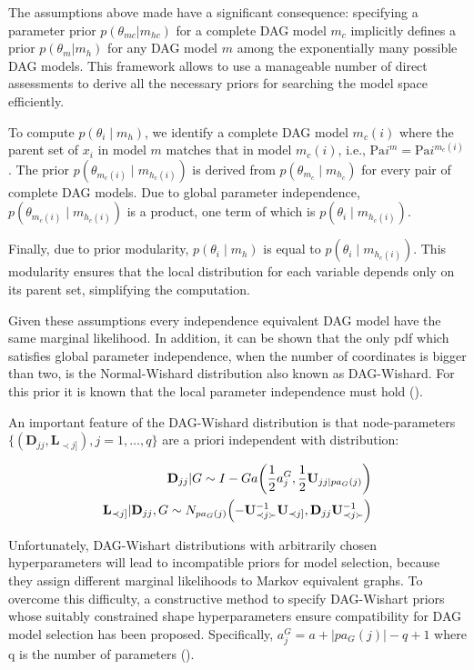 \documentclass{report}
\begin{document}
The assumptions above made have a significant consequence: specifying a parameter prior $p(\theta_{mc}|m_{hc})$ for a complete DAG model $m_c$ implicitly defines a prior $p(\theta_m | m_h)$ for any DAG model $m$ among the exponentially many possible DAG models. This framework allows  to use a manageable number of direct assessments to derive all the necessary priors for searching the model space efficiently. 

To compute $p(\theta_i \mid m_h)$, we identify a complete DAG model $m_c(i)$ where the parent set of $x_i$ in model $m$ matches that in model $m_c(i)$, i.e., $\text{Pa}i^m = \text{Pa}i^{m_c(i)}$. The prior $p(\theta_{m_c(i)} \mid m_{h_c(i)})$ is derived from $p(\theta_{m_c} \mid m_{h_c})$ for every pair of complete DAG models. Due to global parameter independence, $p(\theta_{m_c(i)} \mid m_{h_c(i)})$ is a product, one term of which is $p(\theta_i \mid m_{h_c(i)})$.

Finally, due to prior modularity, $p(\theta_i \mid m_h)$ is equal to $p(\theta_i \mid m_{h_c(i)})$. This modularity ensures that the local distribution for each variable depends only on its parent set, simplifying the computation. 

Given these assumptions every independence equivalent DAG model have the same marginal likelihood. 
In addition, it can be shown that the only pdf which satisfies global parameter independence, when the number of coordinates is bigger than two, is the Normal-Wishard distribution also known as DAG-Wishard. For this prior it is known that the local parameter independence must hold (\citet{geiger2002parameter}). 

An important feature of the DAG-Wishard distribution is that node-parameters $\{(\mathbf{D}_{jj}, \mathbf{L}_{\prec j]}), j = 1, \ldots, q\}$ are a priori independent with distribution:

\begin{equation} \label{L-Sigma}
	\begin{split}
		\mathbf{D}_{jj} | G \sim I-Ga  \biggl( \frac{1}{2} a^G_j, \frac{1}{2}\mathbf{U}_{jj | pa_G (j)} \biggr ) \\
		\mathbf{L}_{\prec j]} | \mathbf{D}_{jj}, G \sim N_{pa_G (j)} \Bigl(- \mathbf{U}^{-1}_{\prec j \succ} \mathbf{U}_{\prec j ]}, \mathbf{D}_{jj}\mathbf{U}^{-1}_{\prec j \succ} \Bigr )
	\end{split}
\end{equation}

Unfortunately, DAG-Wishart distributions with arbitrarily chosen hyperparameters will lead to incompatible priors for model selection, because they assign different marginal likelihoods to Markov equivalent graphs. To overcome this difficulty, a constructive method to specify DAG-Wishart priors whose suitably constrained shape hyperparameters ensure compatibility for DAG model selection has been proposed. 
Specifically, $a_j^G = a + |pa_G (j)| -q + 1$ where q is the number of parameters (\citet{peluso2020compatible}).  
\end{document}
